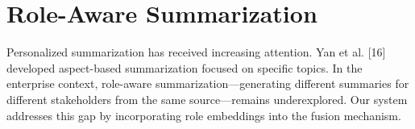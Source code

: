 \section{Role-Aware Summarization}
Personalized summarization has received increasing attention. Yan et al. [16] developed aspect-based summarization focused on specific topics. In the enterprise context, role-aware summarization—generating different summaries for different stakeholders from the same source—remains underexplored. Our system addresses this gap by incorporating role embeddings into the fusion mechanism.
